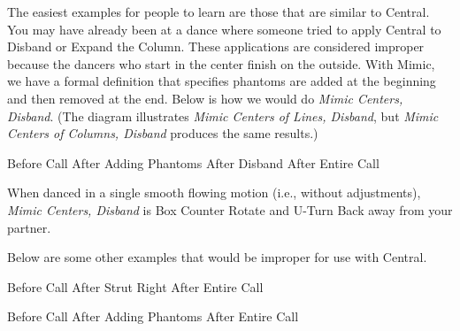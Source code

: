 \documentclass[12pt]{article}
\begin{document}
The easiest examples for people to learn are those that are similar
to Central.  You may have already been at a dance where someone
tried to apply Central to Disband or Expand the Column.
These applications are considered improper because the dancers who start in
the center finish on the outside.
With Mimic, we have a formal definition that specifies phantoms
are added at the beginning and then removed at the end.
Below is how we would do \emph{Mimic Centers, Disband}.
(The diagram illustrates \emph{Mimic Centers of Lines, Disband}, but
\emph{Mimic Centers of Columns, Disband} produces the same results.)

\displayfour
{\cr
 }
{Before Call}
{\cr
 }
{After Adding Phantoms}
{\cr
 \cr
 \cr
 }
{After Disband}
{\cr
 }
{After Entire Call}
\endexample

When danced in a single smooth flowing motion (i.e., without adjustments), 
\emph{Mimic Centers, Disband} is
Box Counter Rotate and U-Turn Back away from your partner.

Below are some other examples that would be improper for use with Central.

\displayfour
{\cr
 }
{Before Call}
{\cr
 \cr
 \cr
 }
{}
{
 }
{After Strut Right}
{}
{After Entire Call}
\endexample

\displayfour
{}
{Before Call}
{\idancer{}\idancer\cr
 \cr
 \idancer{}\idancer}
{After Adding Phantoms}
{\cr
 \cr
 \cr
 }
{}
{\cr
 }
{After Entire Call}
\endexample
\end{document}
